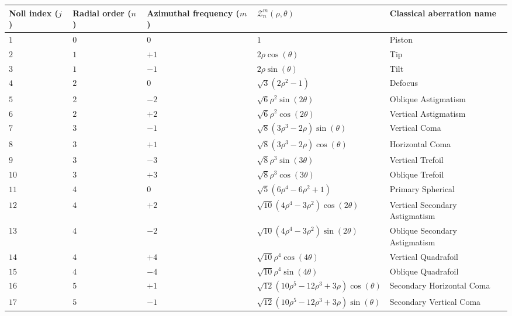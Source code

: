 \begin{table}
	\vspace{-2cm}
	\hspace{-2cm}
	\begin{tabular}{ | p{2cm} | p{1.5cm} | p{2cm} | p{6.25cm} | p{4cm} |}
		\hline
		Noll index ($j$) & Radial order ($n$) & Azimuthal frequency ($m$) & $\mathcal{Z}^{m}_{n}\left(\rho,\theta\right)$ & Classical aberration name \\ \hline
		$1$ & $0$ & $0$ & $1$ & Piston \\ \hline
		$2$ & $1$ & $+1$ & $2\rho \cos(\theta)$ & Tip \\ \hline
		$3$ & $1$ & $-1$ & $2\rho \sin(\theta)$ & Tilt \\ \hline
		$4$ & $2$ & $0$ & $\sqrt{3}\left(2\rho^{2} - 1\right)$ & Defocus \\ \hline	
		$5$ & $2$ & $-2$ & $\sqrt{6}\rho^{2} \sin(2\theta)$ & Oblique Astigmatism \\ \hline
		$6$ & $2$ & $+2$ & $\sqrt{6}\rho^{2} \cos(2\theta)$ & Vertical Astigmatism \\ \hline
		$7$ & $3$ & $-1$ & $\sqrt{8}\left(3\rho^{3} - 2\rho\right) \sin(\theta)$ & Vertical Coma \\ \hline
		$8$ & $3$ & $+1$ & $\sqrt{8}\left(3\rho^{3} - 2\rho\right) \cos(\theta)$ & Horizontal Coma \\ \hline
		$9$ & $3$ & $-3$ & $\sqrt{8}\rho^{3} \sin(3\theta)$ & Vertical Trefoil \\ \hline
		$10$ & $3$ & $+3$ & $\sqrt{8}\rho^{3} \cos(3\theta)$ & Oblique Trefoil \\ \hline
		$11$ & $4$ & $0$ & $\sqrt{5}\left(6\rho^{4} - 6\rho^{2} + 1\right)$ & Primary Spherical \\ \hline	
		$12$ & $4$ & $+2$ & $\sqrt{10}\left(4\rho^{4} - 3\rho^{2}\right) \cos(2\theta)$ & Vertical Secondary Astigmatism \\ \hline
		$13$ & $4$ & $-2$ & $\sqrt{10}\left(4\rho^{4} - 3\rho^{2}\right) \sin(2\theta)$ & Oblique Secondary Astigmatism \\ \hline
		$14$ & $4$ & $+4$ & $\sqrt{10}\rho^{4} \cos(4\theta)$ & Vertical Quadrafoil \\ \hline
		$15$ & $4$ & $-4$ & $\sqrt{10}\rho^{4} \sin(4\theta)$ & Oblique Quadrafoil \\ \hline
		$16$ & $5$ & $+1$ & $\sqrt{12}\left(10\rho^{5} - 12\rho^{3} + 3\rho\right) \cos(\theta)$ & Secondary Horizontal Coma \\ \hline
		$17$ & $5$ & $-1$ & $\sqrt{12}\left(10\rho^{5} - 12\rho^{3} + 3\rho\right) \sin(\theta)$ & Secondary Vertical Coma \\ \hline

\end{tabular}
\end{table}

